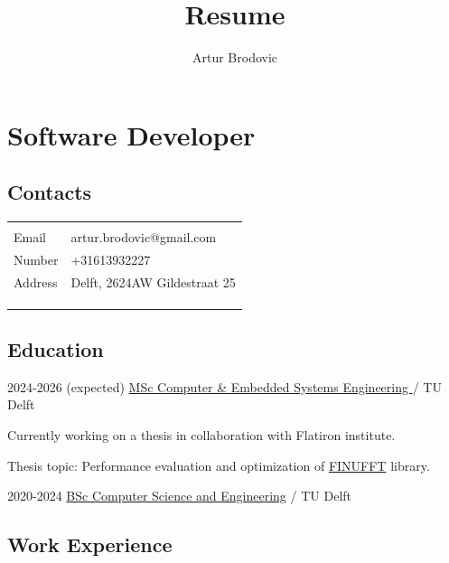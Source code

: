 \documentclass{article}
\begin{document}
\title{Resume}
\author{Artur Brodovic}
\maketitle

\section{Software Developer}
\subsection{Contacts}
\renewcommand{\arraystretch}{1.3}
\vspace{0.5em}
\begin{tabular}{l l}
    \hline \\[-1.0em]
    Email & artur.brodovic@gmail.com \\
    Number & +31613932227 \\
    Address & Delft, 2624AW Gildestraat 25 
\vspace{0.3em} \\
     & \raisebox{0.4em}{\url{https://github.com/magisterbrown}}\\
     & \raisebox{0.4em}{\url{https://www.linkedin.com/in/artur-brodovic}}\\

    \\[-1.0em] \hline 
\end{tabular}
\subsection{Education}
\cvitem
{2024-2026 (expected)}
{\href{https://www.tudelft.nl/onderwijs/opleidingen/masters/cese/msc-computer-embedded-systems-engineering}{MSc Computer \& Embedded Systems Engineering }}
{/ TU Delft}
{Currently working on a thesis in collaboration with Flatiron institute. 

Thesis topic: Performance evaluation and optimization of \href{https://finufft.readthedocs.io/en/latest/}{FINUFFT} library.}
\cvitem
{2020-2024}
{\href{https://www.tudelft.nl/onderwijs/opleidingen/bachelors/cse/bsc-computer-science-and-engineering}{BSc Computer Science and Engineering}}
{/ TU Delft}
{}

\subsection{Work Experience}
\end{document}
